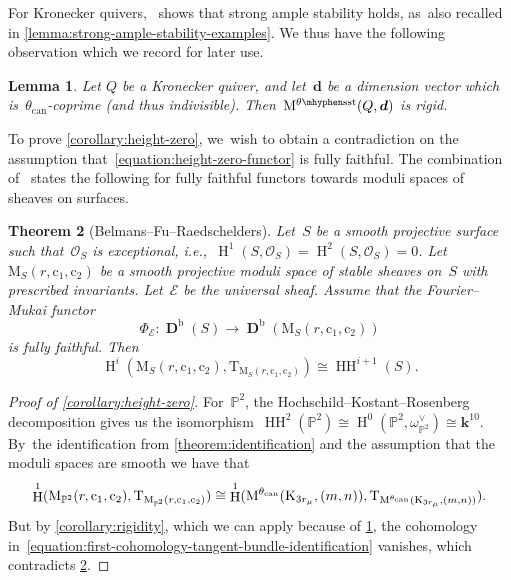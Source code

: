 \documentclass[11pt]{article}
\theoremstyle{plain}
\newtheorem{theorem}{Theorem}[section]
\newtheorem{lemma}[theorem]{Lemma}
\theoremstyle{definition}
\DeclareMathOperator\derived{\mathbf{D}}
\DeclareMathOperator\HH{H}
\DeclareMathOperator\hochschild{HH}
\newcommand\bounded{\ensuremath{\mathrm{b}}}
\newcommand\can{\ensuremath{\mathrm{can}}}
\newcommand\field{\mathbf{k}}
\newcommand\moduli{\ensuremath{\mathrm{M}}}
\newcommand\semistable{\ensuremath{\mhyphen\mathrm{sst}}}
\newcommand\tangent{\ensuremath{\mathrm{T}}}
\newcommand\tuple[1]{\ensuremath{{\boldsymbol{#1}}}}
\begin{document}
For Kronecker quivers,~\cite[Prop.\,6.2]{MR3683503}
shows that strong ample stability holds, as~also recalled in \cref{lemma:strong-ample-stability-examples}.
We thus have the following observation which we record for later use.

\begin{lemma}
\label{lemma:rigidity-kronecker-quivers}
Let $Q$ be a Kronecker quiver,
and let~$\tuple{d}$ be a dimension vector
which is~$\theta_\can$-coprime (and thus indivisible).
Then~$\modulispace[\theta\semistable]{Q,\tuple{d}}$ is rigid.
\end{lemma}

To prove \cref{corollary:height-zero}, we~wish to obtain a contradiction on the assumption that~\eqref{equation:height-zero-functor} is fully faithful.
The combination of~\cite[Prop.\,29, Rem.\,30]{MR3950704} states the following
for fully faithful functors towards moduli spaces of sheaves on surfaces.
\begin{theorem}[Belmans--Fu--Raedschelders]
\label{theorem:fully-faithful-hochschild-cohomology}
Let~$S$ be a smooth projective surface
such that~$\mathcal{O}_S$ is exceptional,
i.e.,~$\HH^1(S,\mathcal{O}_S)=\HH^2(S,\mathcal{O}_S)=0$.
Let~$\moduli_S(r,\mathrm{c}_1,\mathrm{c}_2)$ be a smooth projective moduli space
of stable sheaves on~$S$ with prescribed invariants.
Let~$\mathcal{E}$ be the universal sheaf.
Assume that the Fourier--Mukai functor
\begin{equation*}
\Phi_{\mathcal{E}}\colon\derived^\bounded(S)\to\derived^\bounded(\moduli_S(r,\mathrm{c}_1,\mathrm{c}_2))
\end{equation*}
is fully faithful.
Then
\begin{equation*}
\HH^i(\moduli_S(r,\mathrm{c}_1,\mathrm{c}_2),\tangent_{\moduli_S(r,\mathrm{c}_1,\mathrm{c}_2)})
\cong
\hochschild^{i+1}(S).
\end{equation*}
\end{theorem}

\begin{proof}[Proof of \cref{corollary:height-zero}]
For~$\mathbb{P}^2$,
the Hochschild--Kostant--Rosenberg decomposition
gives us the isomorphism~$\hochschild^2(\mathbb{P}^2)\cong\HH^0(\mathbb{P}^2,\omega_{\mathbb{P}^2}^\vee)\cong\field^{10}$. By~the identification from \cref{theorem:identification}
and the assumption that the moduli spaces are smooth
we have that
\begin{equation}
\label{equation:first-cohomology-tangent-bundle-identification}
\HH^1(\moduli_{\mathbb{P}^2}(r,\mathrm{c}_1,\mathrm{c}_2),\tangent_{\moduli_{\mathbb{P}^2}(r,\mathrm{c}_1,\mathrm{c}_2)})
\cong
\HH^1(\modulispace[\theta_\can]{\mathrm{K}_{3r_\mu},(m,n)},\tangent_{\modulispace[\theta_\can]{\mathrm{K}_{3r_\mu},(m,n)}}).
\end{equation}
But by \cref{corollary:rigidity},
which we can apply because of \cref{lemma:rigidity-kronecker-quivers},
the cohomology in~\eqref{equation:first-cohomology-tangent-bundle-identification} vanishes,
which contradicts \cref{theorem:fully-faithful-hochschild-cohomology}.
\end{proof}
\end{document}
